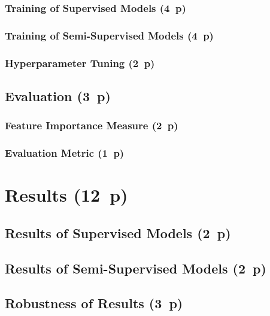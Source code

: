 \subsubsection{Training of Supervised
  Models (4~p)}\label{sec:training-of-supervised-models}


\subsubsection{Training of Semi-Supervised
  Models (4~p)}\label{sec:training-of-semi-supervised-models}


\subsubsection{Hyperparameter Tuning (2~p)}\label{sec:hyperparameter-tuning}


\subsection{Evaluation (3~p)}\label{sec:evaluation}

\subsubsection{Feature Importance
  Measure (2~p)}\label{sec:feature-importance-measure}

\subsubsection{Evaluation Metric (1~p)}\label{sec:evaluation-metric}

\newpage
\section{Results (12~p)}\label{sec:results}

\subsection{Results of Supervised
  Models (2~p)}\label{sec:results-of-supervised-models}

\subsection{Results of Semi-Supervised
  Models (2~p)}\label{sec:results-of-semi-supervised-models}

\subsection{Robustness of Results (3~p)}\label{sec:robustness-checks}

